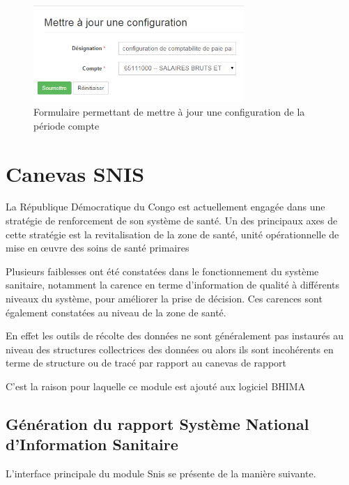 \documentclass[12pt,a4paper]{report}
\begin{document}
\begin{figure}[h]
\begin{center}
\includegraphics[width=8cm]{pic/MettreAConfig.png}
\end{center}
\caption{Formulaire permettant de mettre à jour une configuration de la période compte}
\label{Formulaire permettant de mettre à jour une configuration de la période compte}
\end{figure} 


\chapter{Canevas SNIS}        

La République Démocratique du Congo est actuellement engagée dans une stratégie
de renforcement de son système de santé. Un des principaux axes de cette stratégie
est la revitalisation de la zone de santé, unité opérationnelle de mise en œuvre des
soins de santé primaires

Plusieurs faiblesses ont été constatées dans le fonctionnement du système sanitaire,
notamment la carence en terme d’information de qualité à différents niveaux du
système, pour améliorer la prise de décision. Ces carences sont également
constatées au niveau de la zone de santé.

En effet les outils de récolte des données ne sont généralement pas instaurés au
niveau des structures collectrices des données ou alors ils sont incohérents en
terme de structure ou de tracé par rapport au canevas de rapport

C'est la raison pour laquelle ce module est ajouté aux logiciel BHIMA

\newpage
\section{Génération du rapport Système National d'Information Sanitaire}
L'interface principale du module Snis se présente de la manière suivante.
\end{document}
